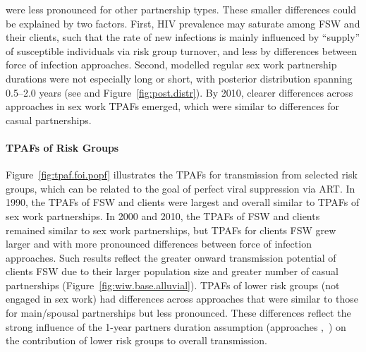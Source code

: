 were less pronounced \vs for other partnership types.
These smaller differences could be explained by two factors.
First, HIV prevalence may saturate among FSW and their clients,
such that the rate of new infections is mainly influenced by
``supply'' of susceptible individuals via risk group turnover,
and less by differences between force of infection approaches.
Second, modelled regular sex work partnership durations were not especially long or short,
with posterior distribution spanning 0.5--2.0 years
(see  and Figure~\ref{fig:post.distr}).
By 2010, clearer differences across approaches in sex work TPAFs emerged,
which were similar to differences for casual partnerships.
\paragraph{TPAFs of Risk Groups}
Figure~\ref{fig:tpaf.foi.popf} illustrates the TPAFs for transmission from selected risk groups,
which can be related to the goal of perfect viral suppression via ART.
In 1990, the TPAFs of FSW and clients were largest
and overall similar to TPAFs of sex work partnerships.
In 2000 and 2010, the TPAFs of FSW and clients remained similar to sex work partnerships,
but TPAFs for clients \vs FSW grew larger
and with more pronounced differences between force of infection approaches.
Such results reflect the greater onward transmission potential of clients \vs FSW
due to their larger population size and greater number of casual partnerships
(\eg Figure~\ref{fig:wiw.base.alluvial}).
TPAFs of lower risk groups (not engaged in sex work) had differences across approaches that were
similar to those for main/spousal partnerships but less pronounced.
These differences reflect the strong influence of the 1-year partners duration assumption
(\ie approaches \ry,~\py) on the contribution of lower risk groups to overall transmission.
